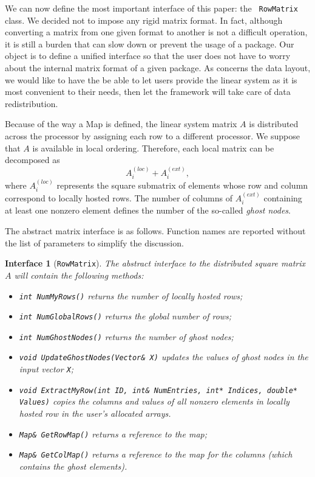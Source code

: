\documentclass[acmtocl]{acmtrans2m}
\newtheorem{interface}{Interface}[section]
\begin{document}
We can now define the most important interface of this paper: the {\tt
  RowMatrix} class. We decided not to impose any rigid matrix format.
In fact, although converting a matrix from
one given format to another is not a difficult operation, it is still a burden
that can slow down or prevent the usage of a package. Our object is to define
a unified interface so that the user does not have to worry about the internal
matrix format of a given package. As concerns the
data layout, we would like to have the be able to let users provide the linear
system as it is most convenient to their needs, then let the framework will
take care of data redistribution.  

Because of the way a Map is defined, the linear system matrix $A$ is
distributed
across the processor by assigning each row to a different processor.
We suppose that $A$ is available in local ordering.
Therefore, each local matrix can be decomposed as
\begin{equation}
A^{(loc)}_i + A^{(ext)}_i,
  \end{equation}
where $A^{(loc)}_i$ represents the square submatrix of elements whose row
and column correspond to locally hosted rows. The number of columns of
$A^{(ext)}_i$ containing at least one nonzero element defines the number of
the so-called {\sl ghost nodes}.

\smallskip

The abstract matrix interface is as
follows. Function names are reported
without the list of parameters to simplify the discussion.

\begin{interface}[{\tt RowMatrix}]
\label{int:ami}
The abstract interface to the distributed square matrix $A$
will contain the following methods:
\begin{itemize}
\item \verb!int NumMyRows()! returns the number of locally hosted rows;
\item \verb!int NumGlobalRows()! returns the global number of rows;
\item \verb!int NumGhostNodes()! returns the number of ghost nodes;
\item \verb!void UpdateGhostNodes(Vector& X)! updates the values of ghost nodes
 in the input vector {\tt X};
\item {\tt void ExtractMyRow(int ID, int\& NumEntries, int* Indices, double*
                             Values)} copies the
columns and values of all nonzero elements in locally hosted row 
in the user's allocated arrays.
\item \verb!Map& GetRowMap()! returns a reference to the map;
\item \verb!Map& GetColMap()! returns a reference to the map for the columns
(which contains the ghost elements).
\end{itemize}
\end{interface}
\end{document}
